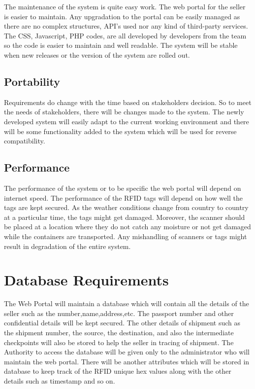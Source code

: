 \documentclass{scrreprt}
\begin{document}
    The maintenance of the system is quite easy work. The web portal for the seller is easier to maintain. Any upgradation to the portal can be easily managed as there are no complex structures, API's used nor any kind of third-party services. The CSS, Javascript, PHP codes, are all developed by developers from the team so the code is easier to maintain and well readable. The system will be stable when new releases or the version of the system are rolled out.\newline
    
    \subsection{ Portability}
    
    Requirements do change with the time based on stakeholders decision. So to meet the needs of stakeholders, there will be changes made to the system. The newly developed system will easily adapt to the current working environment and there will be some functionality added to the system which will be used for reverse compatibility. \newline
    
    \subsection{ Performance}
    
    The performance of the system or to be specific the web portal will depend on internet speed. The performance of the RFID tags will depend on how well the tags are kept secured. As the weather conditions change from country to country at a particular time, the tags might get damaged. Moreover, the scanner should be placed at a location where they do not catch any moisture or not get damaged while the containers are transported. Any mishandling of scanners or tags might result in degradation of the entire system.\newline \newline
    
    \newpage
    

\section{Database Requirements}
The Web Portal will maintain a database which will contain all the details of the seller such as the number,name,address,etc. The passport number and other confidential details will be kept secured. The other details of shipment such as the shipment number, the source, the destination, and also the intermediate checkpoints will also be stored to help the seller in tracing of shipment.
The Authority to access the database will be given only to
the administrator who will maintain the web portal. There will be another attributes which will be stored in database to keep track of the RFID unique hex values along with the other details such as timestamp and so on.
\end{document}
